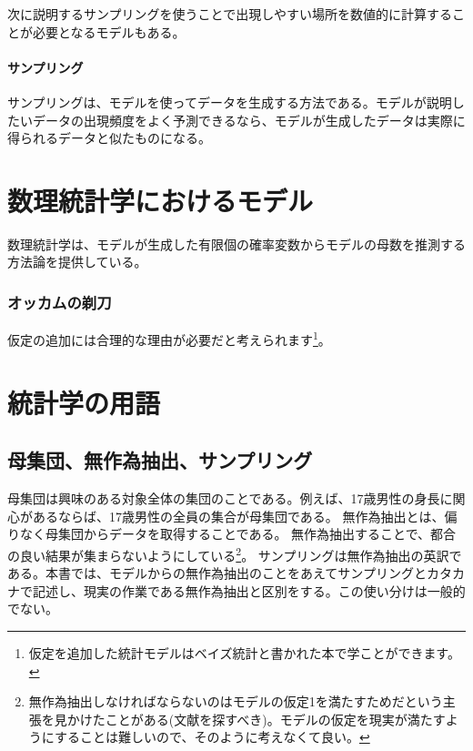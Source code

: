 次に説明するサンプリングを使うことで出現しやすい場所を数値的に計算することが必要となるモデルもある。

\paragraph{サンプリング}
サンプリングは、モデルを使ってデータを生成する方法である。モデルが説明したいデータの出現頻度をよく予測できるなら、モデルが生成したデータは実際に得られるデータと似たものになる。

\section{数理統計学におけるモデル}
数理統計学は、モデルが生成した有限個の確率変数からモデルの母数を推測する方法論を提供している。



\subsubsection{オッカムの剃刀}

仮定の追加には合理的な理由が必要だと考えられます\footnote{仮定を追加した統計モデルはベイズ統計と書かれた本で学ことができます。}。

\begin{figure}
    \begin{center}
%
\end{center}
\end{figure}
\fi
\section{統計学の用語}

\subsection{母集団、無作為抽出、サンプリング}
母集団は興味のある対象全体の集団のことである。例えば、17歳男性の身長に関心があるならば、17歳男性の全員の集合が母集団である。
無作為抽出とは、偏りなく母集団からデータを取得することである。
無作為抽出することで、都合の良い結果が集まらないようにしている\footnote{無作為抽出しなければならないのはモデルの仮定1を満たすためだという主張を見かけたことがある(文献を探すべき)。モデルの仮定を現実が満たすようにすることは難しいので、そのように考えなくて良い。}。
サンプリングは無作為抽出の英訳である。本書では、モデルからの無作為抽出のことをあえてサンプリングとカタカナで記述し、現実の作業である無作為抽出と区別をする。この使い分けは一般的でない。

